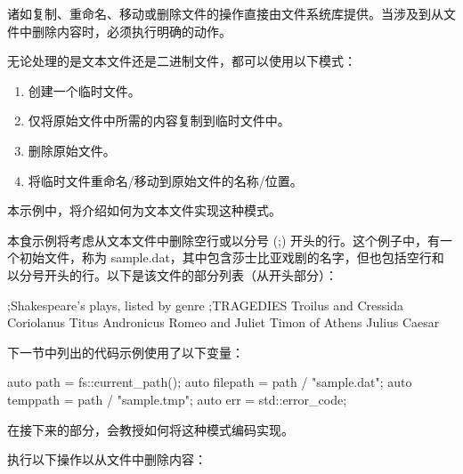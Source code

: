 

诸如复制、重命名、移动或删除文件的操作直接由文件系统库提供。当涉及到从文件中删除内容时，必须执行明确的动作。

无论处理的是文本文件还是二进制文件，都可以使用以下模式：

\begin{enumerate}
\item
创建一个临时文件。

\item
仅将原始文件中所需的内容复制到临时文件中。

\item
删除原始文件。

\item
将临时文件重命名/移动到原始文件的名称/位置。
\end{enumerate}

本示例中，将介绍如何为文本文件实现这种模式。


本食示例将考虑从文本文件中删除空行或以分号 (;) 开头的行。这个例子中，有一个初始文件，称为 sample.dat，其中包含莎士比亚戏剧的名字，但也包括空行和以分号开头的行。以下是该文件的部分列表（从开头部分）：

\begin{shell}
;Shakespeare's plays, listed by genre
;TRAGEDIES
Troilus and Cressida
Coriolanus
Titus Andronicus
Romeo and Juliet
Timon of Athens
Julius Caesar
\end{shell}

下一节中列出的代码示例使用了以下变量：

\begin{cpp}
auto path = fs::current_path();
auto filepath = path / "sample.dat";
auto temppath = path / "sample.tmp";
auto err = std::error_code{};
\end{cpp}

在接下来的部分，会教授如何将这种模式编码实现。


执行以下操作以从文件中删除内容：

